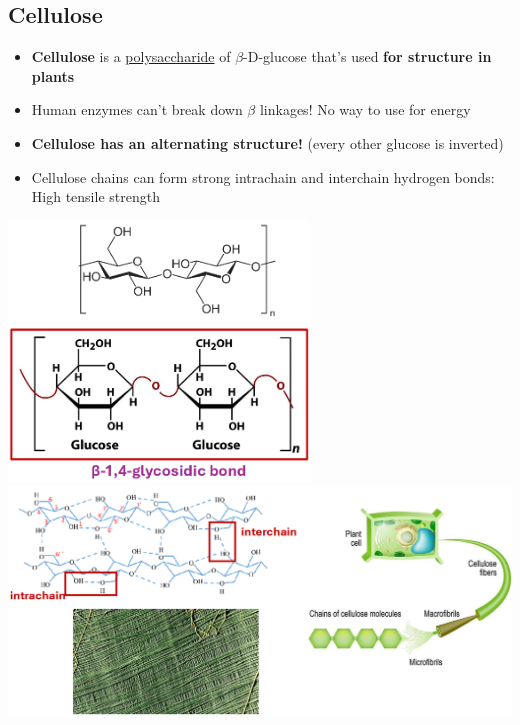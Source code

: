 \documentclass[10pt]{article}
\begin{document}
\subsection*{Cellulose}
\begin{itemize}
    \item \textbf{Cellulose} is a \underline{polysaccharide} of $\beta$-D-glucose that's used \textbf{for structure in plants}
    \item Human enzymes can't break down $\beta$ linkages!  No way to use for energy
    \item \textbf{Cellulose has an alternating structure!}  (every other glucose is inverted)
    \item Cellulose chains can form strong intrachain and interchain hydrogen bonds: High tensile strength
\end{itemize}
\begin{center}
    \includegraphics*[width=0.6\textwidth]{L1_24.png}\\
    \includegraphics*[width=\textwidth]{L1_25.png}
\end{center}
\end{document}
